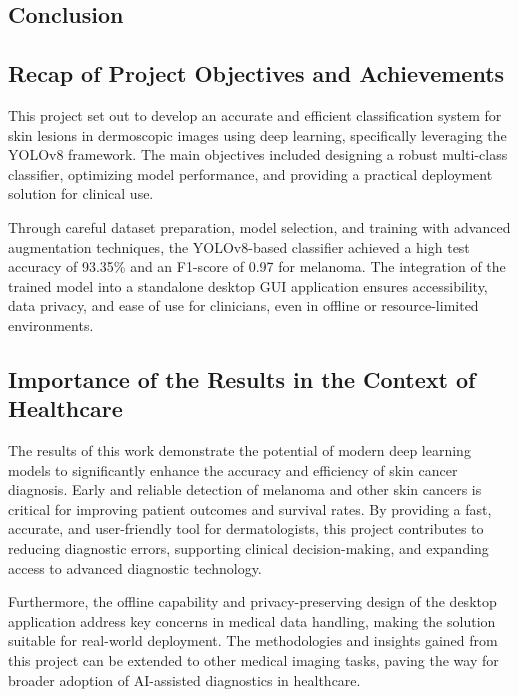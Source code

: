 \documentclass[a4paper,12pt]{report}
\begin{document}
\begin{spacing}{1.5}
\newpage

\chapter{Conclusion}

    \section*{Recap of Project Objectives and Achievements}
    
    This project set out to develop an accurate and efficient classification system for skin lesions in dermoscopic images using deep learning, specifically leveraging the YOLOv8 framework. The main objectives included designing a robust multi-class classifier, optimizing model performance, and providing a practical deployment solution for clinical use.
        
Through careful dataset preparation, model selection, and training with advanced augmentation techniques, the YOLOv8-based classifier achieved a high test accuracy of 93.35\% and an F1-score of 0.97 for melanoma. The integration of the trained model into a standalone desktop GUI application ensures accessibility, data privacy, and ease of use for clinicians, even in offline or resource-limited environments.
        
    \section*{Importance of the Results in the Context of Healthcare}
    
    The results of this work demonstrate the potential of modern deep learning models to significantly enhance the accuracy and efficiency of skin cancer diagnosis. Early and reliable detection of melanoma and other skin cancers is critical for improving patient outcomes and survival rates. By providing a fast, accurate, and user-friendly tool for dermatologists, this project contributes to reducing diagnostic errors, supporting clinical decision-making, and expanding access to advanced diagnostic technology.
    
    Furthermore, the offline capability and privacy-preserving design of the desktop application address key concerns in medical data handling, making the solution suitable for real-world deployment. The methodologies and insights gained from this project can be extended to other medical imaging tasks, paving the way for broader adoption of AI-assisted diagnostics in healthcare.
    

\end{spacing}
\end{document}
